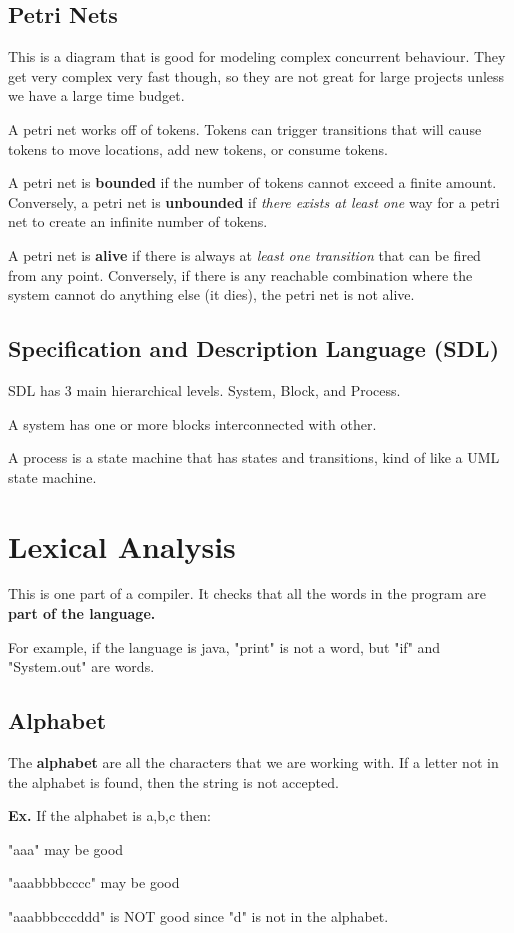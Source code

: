 \documentclass[12pt,letterpaper]{article} \usepackage{amsmath} \usepackage{graphicx} \usepackage[margin=1in]{geometry} \usepackage{longtable}  \usepackage{amssymb}
\begin{document}
	\subsection{Petri Nets}
	This is a diagram that is good for modeling complex concurrent behaviour. They get very complex very fast though, so they are not great for large projects unless we have a large time budget. 
	
	A petri net works off of tokens. Tokens can trigger transitions that will cause tokens to move locations, add new tokens, or consume tokens. 
	
	A petri net is \textbf{bounded} if the number of tokens cannot exceed a finite amount. Conversely, a petri net is \textbf{unbounded} if \textit{there exists at least one} way for a petri net to create an infinite number of tokens. 
	
	A petri net is \textbf{alive} if there is always at \textit{least one transition } that can be fired from any point. Conversely, if there is any reachable combination where the system cannot do anything else (it dies), the petri net is not alive. 
	
	\subsection{Specification and Description Language (SDL)}
	SDL has 3 main hierarchical levels. System, Block, and Process. 
	
	A system has one or more blocks interconnected with other. 
	
	A process is a state machine that has states and transitions, kind of like a UML state machine. 
	
	\section{Lexical Analysis}
	This is one part of a compiler. It checks that all the words in the program are \textbf{part of the language. }
	
	For example, if the language is java, "print" is not a word, but "if" and "System.out" are words. 
	
	\subsection{Alphabet}
	The \textbf{alphabet} are all the characters that we are working with. If a letter not in the alphabet is found, then the string is not accepted. 
	
	\begin{mdframed}
		\textbf{Ex. } If the alphabet is {a,b,c} then:
		
		"aaa" may be good
		
		"aaabbbbcccc" may be good
		
		"aaabbbcccddd" is NOT good since "d" is not in the alphabet. 
		
	\end{mdframed}
\end{document}
